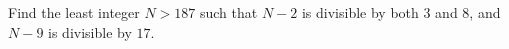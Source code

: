 Find the least integer $ N>187 $ such that $ N-2 $ is divisible by both $ 3 $ and $ 8 $, and $ N-9 $ is divisible by $ 17 $.
